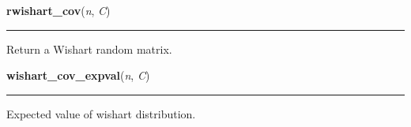     \begin{boxedminipage}{\textwidth}

    \raggedright \textbf{rwishart\_cov}(\textit{n}, \textit{C})

    \vspace{-1.5ex}

    \rule{\textwidth}{0.5\fboxrule}

Return a Wishart random matrix.
    \vspace{1ex}

    \end{boxedminipage}

    \label{pymc:distributions:wishart_cov_expval}

    \vspace{0.5ex}

    \begin{boxedminipage}{\textwidth}

    \raggedright \textbf{wishart\_cov\_expval}(\textit{n}, \textit{C})

    \vspace{-1.5ex}

    \rule{\textwidth}{0.5\fboxrule}

Expected value of wishart distribution.
    \vspace{1ex}

    \end{boxedminipage}

    \label{pymc:distributions:wishart_cov_like}

    \vspace{0.5ex}


